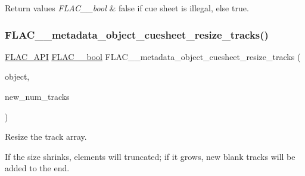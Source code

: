 \begin{DoxyRetVals}{Return values}
{\em F\+L\+A\+C\+\_\+\+\_\+bool} & {\ttfamily false} if cue sheet is illegal, else {\ttfamily true}. \\
\hline
\end{DoxyRetVals}
\mbox{\label{group__flac__metadata__object_gafb0e09fdcfb08c466ceb1f6bca961177}} 
\subsubsection{\texorpdfstring{F\+L\+A\+C\+\_\+\+\_\+metadata\+\_\+object\+\_\+cuesheet\+\_\+resize\+\_\+tracks()}{FLAC\_\_metadata\_object\_cuesheet\_resize\_tracks()}}
{\footnotesize\ttfamily \hyperlink{group__flac__export_ga56ca07df8a23310707732b1c0007d6f5}{F\+L\+A\+C\+\_\+\+A\+PI} \hyperlink{ordinals_8h_a95103469f1cbd78b8cf250194985b34e}{F\+L\+A\+C\+\_\+\+\_\+bool} F\+L\+A\+C\+\_\+\+\_\+metadata\+\_\+object\+\_\+cuesheet\+\_\+resize\+\_\+tracks (\begin{DoxyParamCaption}\item[{\hyperlink{struct_f_l_a_c_____stream_metadata}{F\+L\+A\+C\+\_\+\+\_\+\+Stream\+Metadata} $\ast$}]{object,  }\item[{unsigned}]{new\+\_\+num\+\_\+tracks }\end{DoxyParamCaption})}

Resize the track array.

If the size shrinks, elements will truncated; if it grows, new blank tracks will be added to the end.


